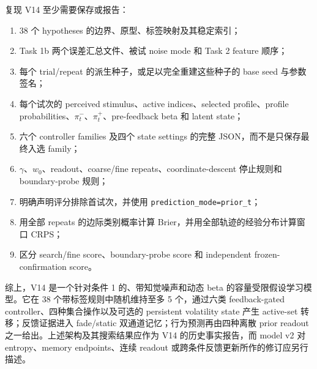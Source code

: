 复现 V14 至少需要保存或报告：
\begin{enumerate}
    \item 38 个 hypotheses 的边界、原型、标签映射及其稳定索引；
    \item Task 1b 两个误差汇总文件、被试 noise mode 和 Task 2 feature 顺序；
    \item 每个 trial/repeat 的派生种子，或足以完全重建这些种子的 base seed 与参数签名；
    \item 每个试次的 perceived stimulus、active indices、selected profile、profile probabilities、$\pi_t^-$、$\pi_t^+$、pre-feedback beta 和 latent state；
    \item 六个 controller families 及四个 state settings 的完整 JSON，而不是只保存最终入选 family；
    \item $\gamma$、$w_0$、readout、coarse/fine repeats、coordinate-descent 停止规则和 boundary-probe 规则；
    \item 明确声明评分排除首试次，并使用 \texttt{prediction\_mode=prior\_t}；
    \item 用全部 repeats 的边际类别概率计算 Brier，并用全部轨迹的经验分布计算窗口 CRPS；
    \item 区分 search/fine score、boundary-probe score 和 independent frozen-confirmation score。
\end{enumerate}

综上，V14 是一个针对条件 1 的、带知觉噪声和动态 beta 的容量受限假设学习模型。它在 38 个带标签规则中随机维持至多 5 个，通过六类 feedback-gated controller、四种集合操作以及可选的 persistent volatility state 产生 active-set 转移；反馈证据进入 fade/static 双通道记忆；行为预测再由四种离散 prior readout 之一给出。上述架构及其搜索结果应作为 V14 的历史事实报告，而 model v2 对 entropy、memory endpoints、连续 readout 或跨条件反馈更新所作的修订应另行描述。
